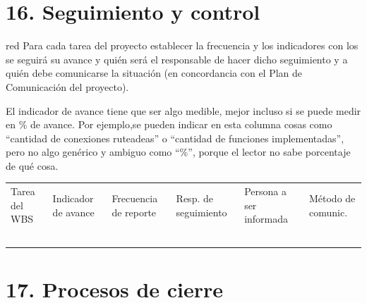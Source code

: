\documentclass[11pt]{charter}
\begin{document}
\section{16. Seguimiento y control}
\label{sec:seguimiento}

\begin{consigna}{red}
Para cada tarea del proyecto establecer la frecuencia y los indicadores con los se seguirá su avance y quién será el responsable de hacer dicho seguimiento y a quién debe comunicarse la situación (en concordancia con el Plan de Comunicación del proyecto).

El indicador de avance tiene que ser algo medible, mejor incluso si se puede medir en \% de avance. Por ejemplo,se pueden indicar en esta columna cosas como ``cantidad de conexiones ruteadeas'' o ``cantidad de funciones implementadas'', pero no algo genérico y ambiguo como ``\%'', porque el lector no sabe porcentaje de qué cosa.

\end{consigna}

\begin{table}[!htpb]
\centering
\begin{tabularx}{\linewidth}{@{}|X|X|X|X|X|X|@{}}
\hline
\rowcolor[HTML]{C0C0C0} 
\multicolumn{6}{|c|}{\cellcolor[HTML]{C0C0C0}SEGUIMIENTO DE AVANCE}                                                                       \\ \hline
\rowcolor[HTML]{C0C0C0} 
Tarea del WBS & Indicador de avance & Frecuencia de reporte & Resp. de seguimiento & Persona a ser informada & Método de comunic. \\ \hline
 &  &  &  &  &  \\ \hline
 &  &  &  &  &  \\ \hline
 &  &  &  &  &  \\ \hline
 &  &  &  &  &  \\ \hline
 &  &  &  &  &  \\ \hline
\end{tabularx}%
\end{table}

\section{17. Procesos de cierre}    
\label{sec:cierre}
\end{document}
